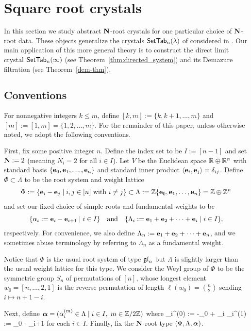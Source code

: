 \documentclass[11pt]{article}
\begin{document}
\section{Square root crystals}
\label{sec:sqrt_crystals}

In this section we study abstract $\mathbf{N}$-root crystals for one particular choice of $\mathbf{N}$-root data.
These objects generalize the crystals $\mathsf{SetTab}_n(\lambda)$ of   considered in \cite{MT2023,MTY,Yu23}.
Our main application of this more general theory is to construct 
the direct limit crystal $\mathsf{SetTab}_n(\infty)$ (see Theorem~\ref{thm:directed_system})
and its Demazure filtration (see Theorem~\ref{dem-thm}).

\subsection{Conventions}
For nonnegative integers $k \leq m$, define $[k, m] := \{k, k+1, \dotsc, m\}$ and $[m] := [1, m] = \{1,2, \dotsc, m\}$.
For the remainder of this paper, unless otherwise noted, we adopt the following conventions.

First, fix some positive integer $n$.
Define the index set to be $I := [n-1]$ and set $\mathbf{N} := 2$ (meaning  $N_i = 2$ for all $i \in I$).
Let $V$ be the Euclidean space $\mathbb{R} \oplus \mathbb{R}^n$ with standard basis $\{\textbf{e}_0, \textbf{e}_1, \dotsc, \textbf{e}_n\}$ and standard inner product $\langle \textbf{e}_i, \textbf{e}_j \rangle = \delta_{ij}$.
Define $\Phi \subset \Lambda$ to be the root system and weight lattice
\[
\Phi := \{ \textbf{e}_i - \textbf{e}_j \mid i,j \in [n]\text{ with }i\neq j\} \subset \Lambda := \mathbb{Z}\{\textbf{e}_0, \textbf{e}_1, \dotsc, \textbf{e}_n\} = \mathbb{Z} \oplus \mathbb{Z}^n
\]
and set our fixed choice of simple roots and fundamental weights to be
\[
\{ \alpha_i := \textbf{e}_i - \textbf{e}_{i+1} \mid i \in I\}
\quad\text{and}\quad
\{ \Lambda_i := \textbf{e}_1 + \textbf{e}_2 + \cdots + \textbf{e}_i \mid i \in I \},
\]
respectively.
For convenience, we also define $\Lambda_n := \textbf{e}_1 + \textbf{e}_2 + \cdots +  \textbf{e}_n$, and we sometimes abuse terminology by referring to $\Lambda_n$ as a fundamental weight.

Notice that $\Phi$ is the usual root system of type $\mathfrak{gl}_n$
but $\Lambda$ is slightly larger than the usual weight lattice for this type.
We consider the Weyl group of $\Phi$ to be the symmetric group $S_n$ of permutations of $[n]$, whose   longest element $w_0 = [n, \dotsc, 2, 1]$ is the reverse permutation of length $\ell(w_0) = \binom{n}{2}$ sending $i \mapsto n+1-i$.

Next, define  $\boldsymbol{\alpha} = (\alpha_i^{(m)} \in \Lambda \mid i \in I, \; m \in \mathbb{Z}/2\mathbb{Z})$ where
\be\label{eq:sqrt_roots}
\alpha_i^{(0)} := -\e_0 + \e_i
\quand
\alpha_i^{(1)} := \e_0  - \e_{i+1}
\ee
for each $i \in I$.
Finally, fix the $\mathbf{N}$-root type $(\Phi, \Lambda, \boldsymbol{\alpha})$.
\end{document}
